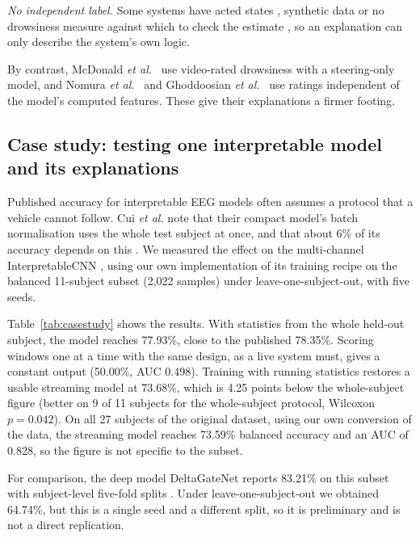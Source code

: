\textit{No independent label.} Some systems have acted states \cite{zeynalpour2025multimethod}, synthetic data \cite{georgiadis2026timeaware} or no drowsiness measure against which to check the estimate \cite{hu2026human,yan2026toward}, so an explanation can only describe the system's own logic.

By contrast, McDonald \textit{et al.}~\cite{mcdonald2014steering} use video-rated drowsiness with a steering-only model, and Nomura \textit{et al.}~\cite{nomura2025drowsiness} and Ghoddoosian \textit{et al.}~\cite{ghoddoosian2019realistic} use ratings independent of the model's computed features. These give their explanations a firmer footing.

\subsection{Case study: testing one interpretable model and its explanations}
\label{sec:casestudy}
Published accuracy for interpretable EEG models often assumes a protocol that a vehicle cannot follow. Cui \textit{et al.} note that their compact model's batch normalisation uses the whole test subject at once, and that about 6\% of its accuracy depends on this \cite{cui2022compact}. We measured the effect on the multi-channel InterpretableCNN \cite{cui2022eeg}, using our own implementation of its training recipe on the balanced 11-subject subset (2{,}022 samples) under leave-one-subject-out, with five seeds.

Table~\ref{tab:casestudy} shows the results. With statistics from the whole held-out subject, the model reaches 77.93\%, close to the published 78.35\%. Scoring windows one at a time with the same design, as a live system must, gives a constant output (50.00\%, AUC 0.498). Training with running statistics restores a usable streaming model at 73.68\%, which is 4.25 points below the whole-subject figure (better on 9 of 11 subjects for the whole-subject protocol, Wilcoxon $p = 0.042$). On all 27 subjects of the original dataset, using our own conversion of the data, the streaming model reaches 73.59\% balanced accuracy and an AUC of 0.828, so the figure is not specific to the subset.

For comparison, the deep model DeltaGateNet reports 83.21\% on this subset with subject-level five-fold splits \cite{po2026deltagatenet}. Under leave-one-subject-out we obtained 64.74\%, but this is a single seed and a different split, so it is preliminary and is not a direct replication.

